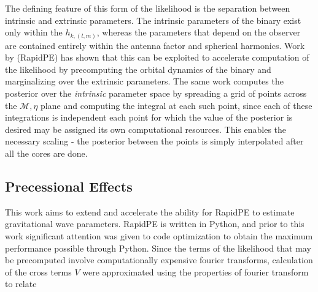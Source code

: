 The defining feature of this form of the likelihood is the separation between intrinsic and extrinsic parameters. The intrinsic parameters of the binary exist only within the $h_{k,(l,m)}$, whereas the parameters that depend on the observer are contained entirely within the antenna factor and spherical harmonics. Work by \cite{rapidpe} (RapidPE) has shown that this can be exploited to accelerate computation of the likelihood by precomputing the orbital dynamics of the binary and marginalizing over the extrinsic parameters. The same work computes the posterior over the \textit{intrinsic} parameter space by spreading a grid of points across the $\mathcal{M}, \eta$ plane and computing the integral at each such point, since each of these integrations is independent each point for which the value of the posterior is desired may be assigned its own computational resources. This enables the necessary scaling - the posterior between the points is simply interpolated after all the cores are done. 

\subsection{Precessional Effects}
This work aims to extend and accelerate the ability for RapidPE to estimate gravitational wave parameters. RapidPE is written in Python, and prior to this work significant attention was given to code optimization to obtain the maximum performance possible through Python. Since the terms of the likelihood that may be precomputed involve computationally expensive fourier transforms, calculation of the cross terms $V$ were approximated using the properties of fourier transform to relate 


